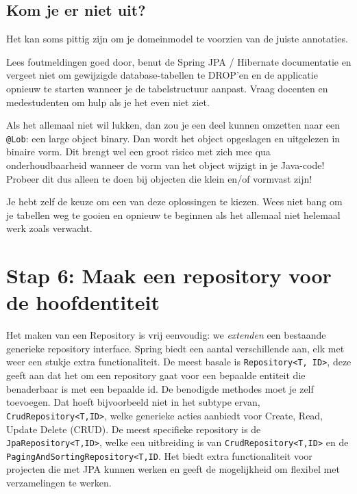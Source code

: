 \subsection{Kom je er niet uit?}
Het kan soms pittig zijn om je domeinmodel te voorzien van de juiste annotaties.

Lees foutmeldingen goed door, benut de Spring JPA / Hibernate documentatie en vergeet niet om 
gewijzigde database-tabellen te DROP'en en de applicatie opnieuw te starten
wanneer je de tabelstructuur aanpast. Vraag docenten en medestudenten om hulp
als je het even niet ziet.

Als het allemaal niet wil lukken, dan zou je een deel kunnen omzetten naar een \texttt{@Lob}:
een large object binary. Dan wordt het object opgeslagen en uitgelezen 
in binaire vorm. Dit brengt wel een groot risico met zich mee qua onderhoudbaarheid
wanneer de vorm van het object wijzigt in je Java-code!
Probeer dit dus alleen te doen bij objecten die klein en/of vormvast zijn!

Je hebt zelf de keuze om een van deze oplossingen te kiezen.
Wees niet bang om je tabellen weg te gooien en opnieuw te beginnen als
het allemaal niet helemaal werk zoals verwacht.

\section{Stap 6: Maak een repository voor de hoofdentiteit}
Het maken van een Repository is vrij eenvoudig: we \textit{extenden} een bestaande 
generieke repository interface. Spring biedt een aantal verschillende aan, elk met 
weer een stukje extra functionaliteit. De meest basale is \texttt{Repository<T, ID>},
deze geeft aan dat het om een repository gaat voor een bepaalde entiteit die benaderbaar is 
met een bepaalde id. De benodigde methodes moet je zelf toevoegen. Dat hoeft bijvoorbeeld niet 
in het subtype ervan, \texttt{CrudRepository<T,ID>}, welke generieke acties aanbiedt voor
Create, Read, Update Delete (CRUD). De meest specifieke repository is de \texttt{JpaRepository<T,ID>},
welke een uitbreiding is van \texttt{CrudRepository<T,ID>} en de \texttt{PagingAndSortingRepository<T,ID}.
Het biedt extra functionaliteit voor projecten die met JPA kunnen werken
en geeft de mogelijkheid om flexibel met verzamelingen te werken.

